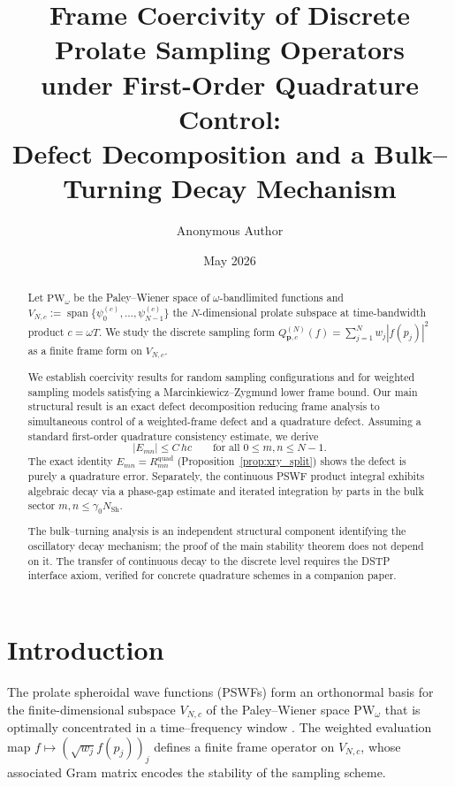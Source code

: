 \documentclass[12pt,a4paper]{amsart}
\title[Frame Coercivity under First-Order Quadrature Control]
      {Frame Coercivity of Discrete Prolate Sampling Operators\\
       under First-Order Quadrature Control:\\
       Defect Decomposition and a Bulk--Turning Decay Mechanism}
\author{Anonymous Author}
\date{May 2026}
\theoremstyle{definition}
\newcommand{\PW}{\mathrm{PW}_\omega}
\newcommand{\QM}{Q^{(N)}_{\mathbf{p},c}}
\begin{document}
\maketitle

\begin{abstract}
Let $\PW$ be the Paley--Wiener space of $\omega$-bandlimited functions
and $V_{N,c}:=\operatorname{span}\{\psi_0^{(c)},\dots,\psi_{N-1}^{(c)}\}$
the $N$-dimensional prolate subspace at time-bandwidth product $c=\omega T$.
We study the discrete sampling form
$\QM(f)=\sum_{j=1}^N w_j|f(p_j)|^2$ as a finite frame form on $V_{N,c}$.

We establish coercivity results for random sampling configurations and
for weighted sampling models satisfying a Marcinkiewicz--Zygmund lower
frame bound. Our main structural result is an exact defect decomposition
reducing frame analysis to simultaneous control of a weighted-frame
defect and a quadrature defect. Assuming a standard first-order
quadrature consistency estimate, we derive
\[
  |E_{mn}| \le C\,hc
  \qquad \text{for all } 0\le m,n\le N-1.
\]
The exact identity $E_{mn} = R_{mn}^{\mathrm{quad}}$
(Proposition~\ref{prop:xry_split}) shows the defect is purely a
quadrature error. Separately, the continuous PSWF product integral
exhibits algebraic decay via a phase-gap estimate and iterated
integration by parts in the bulk sector
$m,n\le\gamma_0 N_{\mathrm{Sh}}$.

The bulk--turning analysis is an independent structural component
identifying the oscillatory decay mechanism; the proof of the main
stability theorem does not depend on it. The transfer of continuous
decay to the discrete level requires the DSTP interface axiom,
verified for concrete quadrature schemes in a companion paper.
\end{abstract}

\tableofcontents

\section{Introduction}

The prolate spheroidal wave functions (PSWFs) form an orthonormal basis
for the finite-dimensional subspace $V_{N,c}$ of the Paley--Wiener
space $\PW$ that is optimally concentrated in a time--frequency window
\cite{Slepian1978,BonamiKaroui}. The weighted evaluation map
$f\mapsto(\sqrt{w_j}f(p_j))_j$ defines a finite frame operator on
$V_{N,c}$, whose associated Gram matrix encodes the stability of the
sampling scheme.
\end{document}
